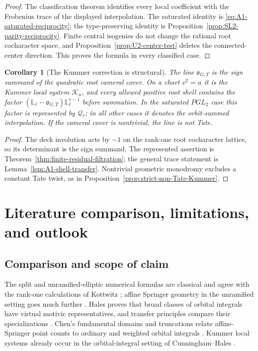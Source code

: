 \documentclass[11pt]{article}
\newtheorem{corollary}[theorem]{Corollary}
\theoremstyle{definition}
\theoremstyle{remark}
\newcommand{\Lell}{\mathbb L_{\ell}}
\newcommand{\cK}{\mathcal K}
\begin{document}
\begin{proof}
The classification theorem identifies every local coefficient with the
Frobenius trace of the displayed interpolation.  The saturated identity is
\eqref{eq:A1-saturated-reciprocity}; the type-preserving identity is
Proposition~\ref{prop:SL2-parity-reciprocity}.  Finite central isogenies do
not change the rational root cocharacter space, and
Proposition~\ref{prop:U2-center-test} deletes the connected-center direction.
This proves the formula in every classified case.
\end{proof}

\begin{corollary}[The Kummer correction is structural]
\label{cor:A1-structural-Kummer}
The line $\mathfrak o_{G,T}$ is the sign summand of the quadratic root
cameral cover.  On a chart $v^2=u$ it is the Kummer local system $\cK_u$,
and every allowed positive root shell contains the factor
$(\Lell-\mathfrak o_{G,T})\Lell^{r-1}$ before summation.  In the saturated
$PGL_2$ case this factor is represented by $\mathscr Q_r$; in all other cases
it denotes the orbit-summed interpolation.  If the cameral cover is
nontrivial, the line is not Tate.
\end{corollary}

\begin{proof}
The deck involution acts by $-1$ on the rank-one root cocharacter lattice, so
its determinant is the sign summand.  The represented assertion is
Theorem~\ref{thm:finite-residual-filtration}; the general trace statement is
Lemma~\ref{lem:A1-shell-transfer}.  Nontrivial geometric monodromy excludes
a constant Tate twist, as in Proposition~\ref{prop:strict-non-Tate-Kummer}.
\end{proof}


\section{Literature comparison, limitations, and outlook}
\label{sec:literature-outlook}

\subsection{Comparison and scope of claim}

The split and unramified-elliptic numerical formulas are classical and agree
with the rank-one calculations of Kottwitz \cite{KottwitzOrbital}; affine
Springer geometry in the unramified setting goes much further
\cite{GKM}.  Hales proves that broad classes of orbital integrals have
virtual motivic representatives, and transfer principles compare their
specializations \cite{HalesMotivic,CluckersHalesLoeser}.  Chen's fundamental
domains and truncations relate affine-Springer point counts to ordinary and
weighted orbital integrals
\cite{ChenFundamentalDomain,ChenWeighted,ChenLocalBehavior}.
Kummer local systems already occur in the orbital-integral setting of
Cunningham--Hales \cite{CunninghamHalesGood}.
\end{document}
